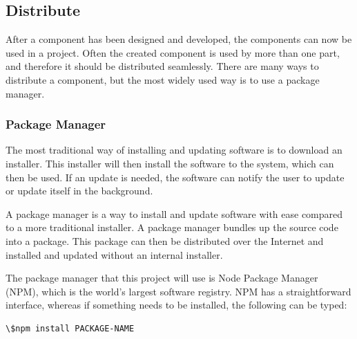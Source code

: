 





\subsection{Distribute}%
\label{sub:Distribute}
After a \gls{component} has been designed and developed, the components can now be used in a project. Often the created component is used by more than one part, and therefore it should be distributed seamlessly. There are many ways to distribute a component, but the most widely used way is to use a package manager.


\subsubsection{Package Manager}%
\label{sub:Package Manager}

The most traditional way of installing and updating software is to download an installer. This installer will then install the software to the system, which can then be used. If an update is needed, the software can notify the user to update or update itself in the background.

A package manager is a way to install and update software with ease compared to a more traditional installer. A package manager bundles up the source code into a package. This package can then be distributed over the Internet and installed and updated without an internal installer. 

The package manager that this project will use is Node Package Manager (NPM), which is the world's largest software registry\cite{NpmNpmDocs}.
NPM has a straightforward interface, whereas if something needs to be installed, the following can be typed: 


\begin{lstlisting}[style=htmlcssjs]
\$npm install PACKAGE-NAME
\end{lstlisting}

